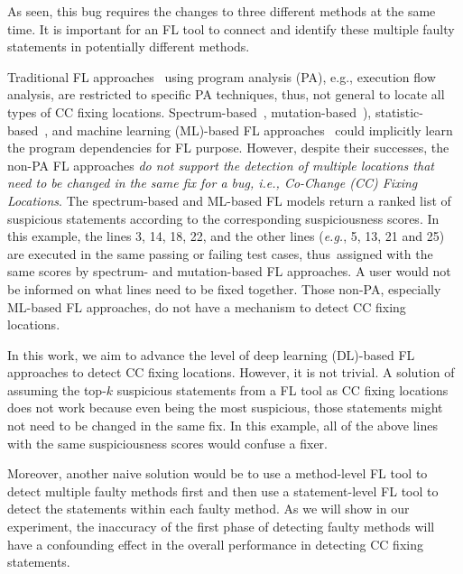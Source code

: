  As seen, this
bug requires the changes to three different methods at the same time.
It is important for an FL tool to connect and identify these multiple
faulty statements in potentially different methods.


Traditional FL approaches~\cite{zhang-fse09,ICICA-10} using program
analysis (PA), e.g., execution flow analysis, are restricted to
specific PA techniques, thus, not general to locate all types of CC
fixing locations.
Spectrum-based~\cite{jones2005empirical,abreu2006evaluation},
mutation-based~\cite{MUSE,papadakis2012using,Metallaxis}),
statistic-based~\cite{liblit-pldi05}, and machine learning (ML)-based
FL approaches~\cite{DeepFL,icse21-fl} could implicitly learn the
program dependencies for FL purpose. However, despite their successes,
the non-PA FL approaches {\em do not support the detection of multiple
  locations that need to be changed in the same fix for a bug, i.e.,
  Co-Change (CC) Fixing Locations}.
%
The spectrum-based and ML-based FL models return a ranked list of
suspicious statements according to the corresponding suspiciousness
scores. In this example, the lines 3, 14, 18, 22, and the other lines
({\em e.g.}, 5, 13, 21 and 25) are executed in the same passing or
failing test cases, thus~assigned with the same scores by
spectrum- and mutation-based FL approaches. A user would not be
informed on what lines need to be fixed together. Those non-PA,
especially ML-based FL approaches, do not have a mechanism to detect CC
fixing locations.

In this work, we aim to advance the level of deep learning (DL)-based
FL approaches to detect CC fixing locations. However, it is not
trivial. A solution of assuming the top-$k$ suspicious statements from
a FL tool as CC fixing locations does not work because even being the
most suspicious, those statements might not need to be changed in the
same fix. In this example, all of the above lines with the same
suspiciousness scores would confuse a fixer.

Moreover, another naive solution would be to use a method-level FL
tool to detect multiple faulty methods first and then use a
statement-level FL tool to detect the statements within each faulty
method. As we will show in our experiment, the inaccuracy of the first
phase of detecting faulty methods will have a confounding effect in
the overall performance in detecting CC fixing statements.


